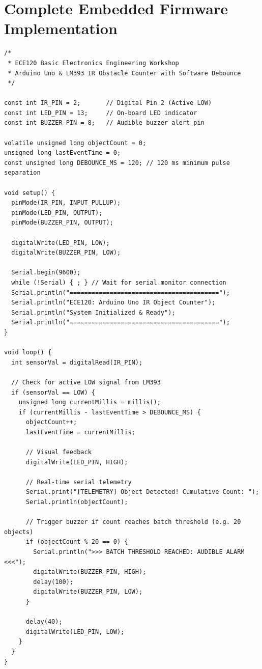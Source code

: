 \section{Complete Embedded Firmware Implementation}
\begin{solutionbox}
\begin{verbatim}
/*
 * ECE120 Basic Electronics Engineering Workshop
 * Arduino Uno & LM393 IR Obstacle Counter with Software Debounce
 */

const int IR_PIN = 2;       // Digital Pin 2 (Active LOW)
const int LED_PIN = 13;     // On-board LED indicator
const int BUZZER_PIN = 8;   // Audible buzzer alert pin

volatile unsigned long objectCount = 0;
unsigned long lastEventTime = 0;
const unsigned long DEBOUNCE_MS = 120; // 120 ms minimum pulse separation

void setup() {
  pinMode(IR_PIN, INPUT_PULLUP);
  pinMode(LED_PIN, OUTPUT);
  pinMode(BUZZER_PIN, OUTPUT);
  
  digitalWrite(LED_PIN, LOW);
  digitalWrite(BUZZER_PIN, LOW);
  
  Serial.begin(9600);
  while (!Serial) { ; } // Wait for serial monitor connection
  Serial.println("=========================================");
  Serial.println("ECE120: Arduino Uno IR Object Counter");
  Serial.println("System Initialized & Ready");
  Serial.println("=========================================");
}

void loop() {
  int sensorVal = digitalRead(IR_PIN);
  
  // Check for active LOW signal from LM393
  if (sensorVal == LOW) {
    unsigned long currentMillis = millis();
    if (currentMillis - lastEventTime > DEBOUNCE_MS) {
      objectCount++;
      lastEventTime = currentMillis;
      
      // Visual feedback
      digitalWrite(LED_PIN, HIGH);
      
      // Real-time serial telemetry
      Serial.print("[TELEMETRY] Object Detected! Cumulative Count: ");
      Serial.println(objectCount);
      
      // Trigger buzzer if count reaches batch threshold (e.g. 20 objects)
      if (objectCount % 20 == 0) {
        Serial.println(">>> BATCH THRESHOLD REACHED: AUDIBLE ALARM <<<");
        digitalWrite(BUZZER_PIN, HIGH);
        delay(100);
        digitalWrite(BUZZER_PIN, LOW);
      }
      
      delay(40);
      digitalWrite(LED_PIN, LOW);
    }
  }
}
\end{verbatim}
\end{solutionbox}

